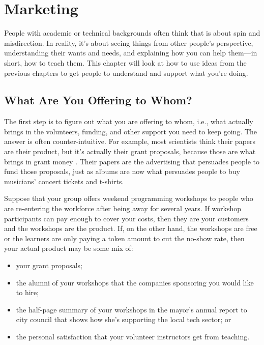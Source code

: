 \chapter{Marketing}\label{s:marketing}

People with academic or technical backgrounds often think that
 is about spin and misdirection.
In reality,
it's about seeing things from other people's perspective,
understanding their wants and needs,
and explaining how you can help them---in short,
how to teach them.
This chapter will look at how to use ideas from the previous chapters
to get people to understand and support what you're doing.

\section{What Are You Offering to Whom?}\label{s:marketing-what-whom}

The first step is to figure out what you are offering to whom,
i.e.,
what actually brings in the volunteers,
funding,
and other support you need to keep going.
The answer is often counter-intuitive.
For example,
most scientists think their papers are their product,
but it's actually their grant proposals,
because those are what brings in grant money \cite{Kuch2011}.
Their papers are the advertising that persuades people to fund those proposals,
just as albums are now what persuades people to buy musicians' concert tickets and t-shirts.

Suppose that your group offers weekend programming workshops
to people who are re-entering the workforce after being away for several years.
If workshop participants can pay enough to cover your costs,
then they are your customers and the workshops are the product.
If,
on the other hand,
the workshops are free or the learners are only paying a token amount to cut the no-show rate,
then your actual product may be some mix of:

\begin{itemize}

\item
  your grant proposals;

\item
  the alumni of your workshops
  that the companies sponsoring you would like to hire;

\item
  the half-page summary of your workshops in the mayor's annual report to city council
  that shows how she's supporting the local tech sector;
  or

\item
  the personal satisfaction that your volunteer instructors get from teaching.

\end{itemize}


